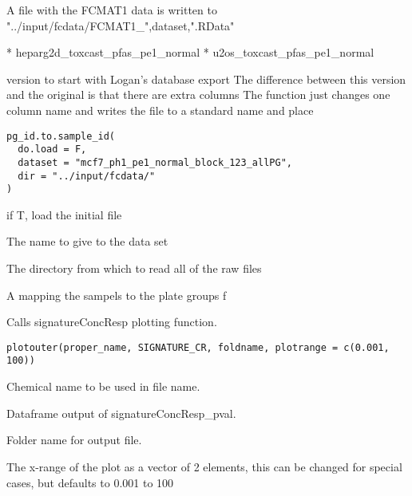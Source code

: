 \documentclass[letterpaper]{book}
\begin{document}
%
\begin{Value}
A file with the FCMAT1 data is written to "../input/fcdata/FCMAT1\_",dataset,".RData"

* heparg2d\_toxcast\_pfas\_pe1\_normal
* u2os\_toxcast\_pfas\_pe1\_normal
\end{Value}
%
\begin{Description}\relax
version to start with Logan's database export
The difference between this version and the original is that there are extra columns
The function just changes one column name and writes the file to a standard name and place
\end{Description}
%
\begin{Usage}
\begin{verbatim}
pg_id.to.sample_id(
  do.load = F,
  dataset = "mcf7_ph1_pe1_normal_block_123_allPG",
  dir = "../input/fcdata/"
)
\end{verbatim}
\end{Usage}
%
\begin{Arguments}
\begin{ldescription}
\item[\code{do.load}] if T, load the initial file

\item[\code{dataset}] The name to give to the data set

\item[\code{dir}] The directory from which to read all of the raw files
\end{ldescription}
\end{Arguments}
%
\begin{Value}
A mapping the sampels to the plate groups
f
\end{Value}
%
\begin{Description}\relax
Calls signatureConcResp plotting function.
\end{Description}
%
\begin{Usage}
\begin{verbatim}
plotouter(proper_name, SIGNATURE_CR, foldname, plotrange = c(0.001, 100))
\end{verbatim}
\end{Usage}
%
\begin{Arguments}
\begin{ldescription}
\item[\code{proper\_name}] Chemical name to be used in file name.

\item[\code{SIGNATURE\_CR}] Dataframe output of signatureConcResp\_pval.

\item[\code{foldname}] Folder name for output file.

\item[\code{plotrange}] The x-range of the plot as a vector of 2 elements, this can be changed for special cases, but defaults to 0.001 to 100
\end{ldescription}
\end{Arguments}
\end{document}
